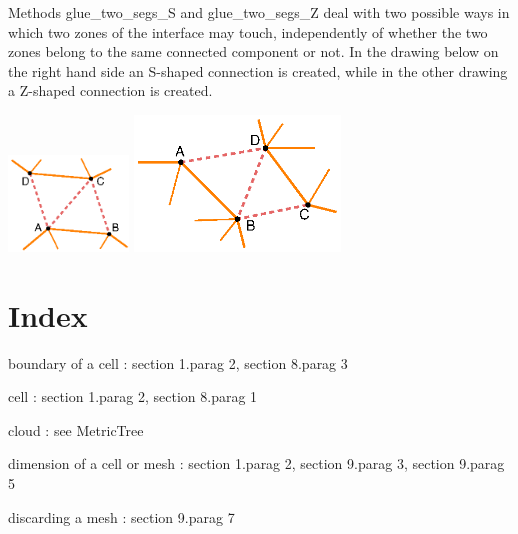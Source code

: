 {Methods {\codett glue\_two\_segs\_S} and
{\codett glue\_two\_segs\_Z} deal with two possible ways in which two
zones of the interface may touch,
independently of whether the two zones belong to the same connected component or not.
In the drawing below on the right hand side an S-shaped connection is created,
while in the other drawing a Z-shaped connection is created.


{ 
  \centerline{\includegraphics[width=32mm]{connect-S.eps}
  \hskip10mm \includegraphics[width=55mm]{connect-Z.eps}} }




\section{Index}

boundary of a cell : \numb section 1.\numb parag 2, \numb section 8.\numb parag 3

cell : \numb section 1.\numb parag 2, \numb section 8.\numb parag 1

cloud : see {\codett MetricTree}

dimension of a cell or mesh : \numb section 1.\numb parag 2, \numb section 9.\numb parag 3,
\numb section 9.\numb parag 5

discarding a mesh : \numb section 9.\numb parag 7

}
